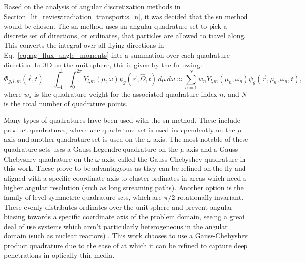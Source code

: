 Based on the analysis of angular discretization methods in Section~\ref{lit_review:radiation_transport:s_n}, it was decided that the \acrshort{sn} method would be chosen. The \acrshort{sn} method uses an angular quadrature set to pick a discrete set of directions, or ordinates, that particles are allowed to travel along. This converts the integral over all flying directions in Eq.~\ref{eq:mg_flux_angle_moments} into a summation over each quadrature direction. In 3D on the unit sphere, this is given by the following:
\begin{equation}\label{eq:angular_quad_integral}
    \Phi_{g,l,m}(\vec{r}, t) = \int_{-1}^{1}\int_{0}^{2\pi}Y_{l,m}(\mu, \omega)\psi_{g}(\vec{r}, \hat{\Omega}, t)\,d\mu\,d\omega \approx \sum_{n = 1}^{N} w_{n} Y_{l,m}(\mu_{n}, \omega_{n})\psi_{g}(\vec{r}, \mu_{n}, \omega_{n}, t)\text{,}
\end{equation}
where $w_{n}$ is the quadrature weight for the associated quadrature index $n$, and $N$ is the total number of quadrature points. 

Many types of quadratures have been used with the \acrshort{sn} method. These include product quadratures, where one quadrature set is used independently on the $\mu$ axis and another quadrature set is used on the $\omega$ axis. The most notable of these quadrature sets uses a Gauss-Legendre quadrature on the $\mu$ axis and a Gauss-Chebyshev quadrature on the $\omega$ axis, called the Gauss-Chebyshev quadrature in this work. These prove to be advantageous as they can be refined on the fly and aligned with a specific coordinate axis to cluster ordinates in areas which need a higher angular resolution (such as long streaming paths). Another option is the family of level symmetric quadrature sets, which are $\pi/2$ rotationally invariant. These evenly distributes ordinates over the unit sphere and prevent angular biasing towards a specific coordinate axis of the problem domain, seeing a great deal of use systems which aren't particularly heterogeneous in the angular domain (such as nuclear reactors) \cite{applied_reactor_physics}. This work chooses to use a Gauss-Chebyshev product quadrature due to the ease of at which it can be refined to capture deep penetrations in optically thin media. 

